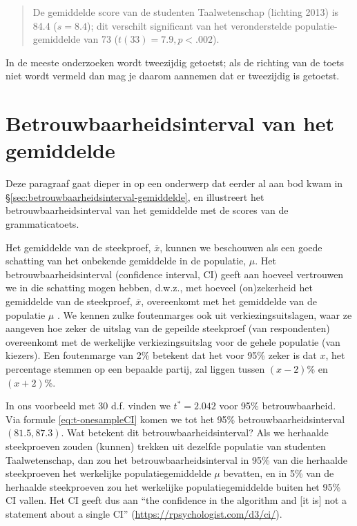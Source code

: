 \documentclass[
]{book}
\begin{document}
\begin{quote}
De gemiddelde score van de studenten Taalwetenschap (lichting 2013) is
84.4 (\(s=8.4\)); dit verschilt significant van het veronderstelde
populatie-gemiddelde van 73 (\(t(33)=7.9, p<.002\)).
\end{quote}

In de meeste onderzoeken wordt tweezijdig getoetst; als de richting van
de toets niet wordt vermeld dan mag je daarom aannemen dat er tweezijdig
is getoetst.

\section{Betrouwbaarheidsinterval van het gemiddelde}\label{sec:t-betrouwbaarheidsinterval-gemiddelde}

Deze paragraaf gaat dieper in op een onderwerp dat eerder al aan bod
kwam in §\ref{sec:betrouwbaarheidsinterval-gemiddelde}, en illustreert
het betrouwbaarheidsinterval van het gemiddelde met de scores van de
grammaticatoets.

Het gemiddelde van de steekproef, \(\overline{x}\), kunnen we beschouwen
als een goede schatting van het onbekende gemiddelde in de populatie,
\(\mu\). Het betrouwbaarheidsinterval (confidence interval, CI) geeft aan
hoeveel vertrouwen we in die schatting mogen hebben, d.w.z., met hoeveel
(on)zekerheid het gemiddelde van de steekproef, \(\overline{x}\),
overeenkomt met het gemiddelde van de populatie \(\mu\) \citep{Cumm12}. We
kennen zulke foutenmarges ook uit verkiezingsuitslagen, waar ze aangeven
hoe zeker de uitslag van de gepeilde steekproef (van respondenten)
overeenkomt met de werkelijke verkiezingsuitslag voor de gehele
populatie (van kiezers). Een foutenmarge van 2\% betekent dat het voor
95\% zeker is dat \(x\), het percentage stemmen op een bepaalde partij, zal
liggen tussen \((x-2)\)\% en \((x+2)\)\%.

In ons voorbeeld met 30 d.f. vinden we \(t^*=2.042\) voor 95\%
betrouwbaarheid. Via formule \eqref{eq:t-onesampleCI} komen we tot het
95\% betrouwbaarheidsinterval \((81.5, 87.3)\). Wat betekent dit
betrouwbaarheidsinterval? Als we herhaalde steekproeven zouden (kunnen)
trekken uit dezelfde populatie van studenten Taalwetenschap, dan zou het
betrouwbaarheidsinterval in 95\% van die herhaalde steekproeven het
werkelijke populatiegemiddelde \(\mu\) bevatten, en in 5\% van de herhaalde
steekproeven zou het werkelijke populatiegemiddelde buiten het 95\% CI
vallen. Het CI geeft dus aan ``the confidence in the algorithm and {[}it
is{]} not a statement about a single CI''
(\url{https://rpsychologist.com/d3/ci/}).
\end{document}
